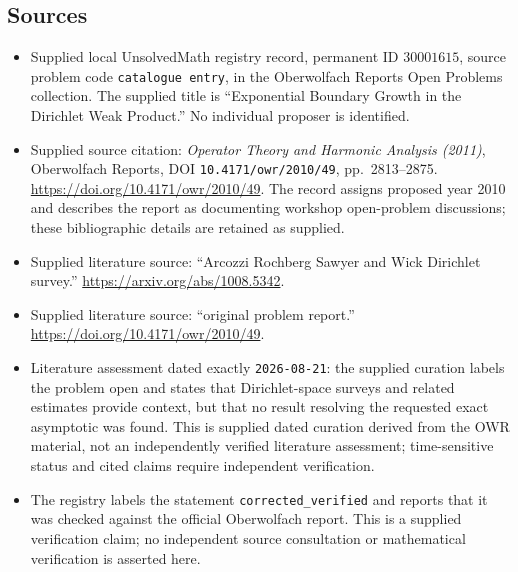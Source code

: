 \documentclass[11pt]{article}
\begin{document}
\subsection{Sources}
\begin{itemize}
\item Supplied local UnsolvedMath registry record, permanent ID \(30001615\), source problem code \texttt{catalogue entry}, in the Oberwolfach Reports Open Problems collection. The supplied title is ``Exponential Boundary Growth in the Dirichlet Weak Product.'' No individual proposer is identified.
\item Supplied source citation: \emph{Operator Theory and Harmonic Analysis (2011)}, Oberwolfach Reports, DOI \texttt{10.4171/owr/2010/49}, pp.\ 2813--2875. \url{https://doi.org/10.4171/owr/2010/49}. The record assigns proposed year 2010 and describes the report as documenting workshop open-problem discussions; these bibliographic details are retained as supplied.
\item Supplied literature source: ``Arcozzi Rochberg Sawyer and Wick Dirichlet survey.'' \url{https://arxiv.org/abs/1008.5342}.
\item Supplied literature source: ``original problem report.'' \url{https://doi.org/10.4171/owr/2010/49}.
\item Literature assessment dated exactly \texttt{2026-08-21}: the supplied curation labels the problem open and states that Dirichlet-space surveys and related estimates provide context, but that no result resolving the requested exact asymptotic was found. This is supplied dated curation derived from the OWR material, not an independently verified literature assessment; time-sensitive status and cited claims require independent verification.
\item The registry labels the statement \texttt{corrected\_verified} and reports that it was checked against the official Oberwolfach report. This is a supplied verification claim; no independent source consultation or mathematical verification is asserted here.
\end{itemize}
\end{document}
